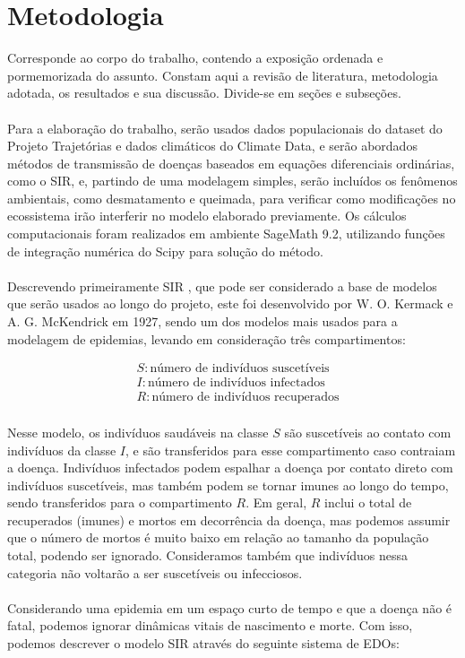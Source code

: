 \chapter{Metodologia}

Corresponde ao corpo do trabalho, contendo a exposição ordenada e pormemorizada
do assunto. Constam aqui a revisão de literatura, metodologia adotada, os resultados e
sua discussão. Divide-se em seções e subseções. \cite{pimenta_orfano_bahia_duarte_rios-velasquez_melo_pessoa_oliveira_campos_villegas_etal_2015}
\\\\
Para a elaboração do trabalho, serão usados dados populacionais 
do dataset do Projeto Trajetórias e dados climáticos do Climate Data, 
e serão abordados métodos de transmissão de doenças baseados em equações 
diferenciais ordinárias, como o SIR, e, partindo de uma modelagem simples, 
serão incluídos os fenômenos ambientais, como desmatamento e queimada, para 
verificar como modificações no ecossistema irão interferir no modelo elaborado 
previamente. Os cálculos computacionais foram realizados em ambiente SageMath 9.2, 
utilizando funções de integração numérica do Scipy para solução do método.
\\\\
Descrevendo primeiramente SIR \cite{githubMODBIO, Prasad2022}, que pode ser considerado a base de modelos que serão usados ao longo do projeto, este foi desenvolvido por W. O. Kermack e A. G. McKendrick em 1927, sendo um dos modelos mais usados para a modelagem de epidemias, levando em consideração três compartimentos:

\begin{align*}
    & S: \text{número de indivíduos suscetíveis} \\
    & I: \text{número de indivíduos infectados} \\
    & R: \text{número de indivíduos recuperados}
\end{align*}
\\
Nesse modelo, os indivíduos saudáveis na classe $S$ são suscetíveis ao contato com indivíduos da classe $I$, e são transferidos para esse compartimento caso contraiam a doença. Indivíduos infectados podem espalhar a doença por contato direto com indivíduos suscetíveis, mas também podem se tornar imunes ao longo do tempo, sendo transferidos para o compartimento $R$. Em geral, $R$ inclui o total de recuperados (imunes) e mortos em decorrência da doença, mas podemos assumir que o número de mortos é muito baixo em relação ao tamanho da população total, podendo ser ignorado. Consideramos também que indivíduos nessa categoria não voltarão a ser suscetíveis ou infecciosos.   
\\\\
Considerando uma epidemia em um espaço curto de tempo e que a doença não é fatal, podemos ignorar dinâmicas vitais de nascimento e morte. Com isso, podemos descrever o modelo SIR através do seguinte sistema de EDOs:

